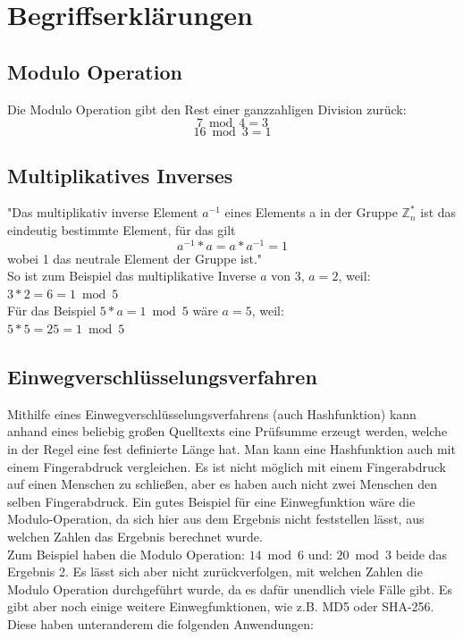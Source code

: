 \documentclass[12pt,a4paper]{scrartcl}
\begin{document}

\pagebreak


\section{Begriffserklärungen}
	\subsection{Modulo Operation} %
	Die Modulo Operation gibt den Rest einer ganzzahligen Division zurück:
	$$ {7 \bmod 4 = 3} $$
	$$ {16 \bmod 3 = 1} $$
	
	\subsection{Multiplikatives Inverses}
	"Das multiplikativ inverse Element $a^{-1}$ eines Elements a in der Gruppe $\mathbb{Z}_n ^*$ ist das eindeutig bestimmte Element, für das gilt $${a^{-1} * a  =  a * a^{-1}  =  1}$$ wobei 1 das neutrale Element der Gruppe ist." \cite{hwlang} \\
	
	So ist zum Beispiel das multiplikative Inverse $a$ von 3, $a=2$, weil: \\
	${3 * 2 = 6 = 1 \bmod 5}$ \\
	
	Für das Beispiel ${5 * a = 1 \bmod 5}$ wäre $a=5$, weil: \\
	${5 * 5 = 25 = 1 \bmod 5}$ \\
	
	\subsection{Einwegverschlüsselungsverfahren}
	Mithilfe eines Einwegverschlüsselungsverfahrens (auch Hashfunktion) kann anhand eines beliebig großen Quelltexts eine Prüfsumme erzeugt werden, welche in der Regel eine fest definierte Länge hat. Man kann eine Hashfunktion auch mit einem Fingerabdruck vergleichen. Es ist nicht möglich mit einem Fingerabdruck auf einen Menschen zu schließen, aber es haben auch nicht zwei Menschen den selben Fingerabdruck.\cite[S.11]{Beutelspacher2015-jl} Ein gutes Beispiel für eine Einwegfunktion wäre die Modulo-Operation, da sich hier aus dem Ergebnis nicht feststellen lässt, aus welchen Zahlen das Ergebnis berechnet wurde. \\
	Zum Beispiel haben die Modulo Operation: ${14 \bmod 6}$  und: ${20 \bmod 3}$ beide das Ergebnis 2. Es lässt sich aber nicht zurückverfolgen, mit welchen Zahlen die Modulo Operation durchgeführt wurde, da es dafür unendlich viele Fälle gibt. Es gibt aber noch einige weitere Einwegfunktionen, wie z.B. MD5 oder SHA-256.\cite[S.11]{Beutelspacher2015-jl} Diese haben unteranderem die folgenden Anwendungen:
	
\end{document}
